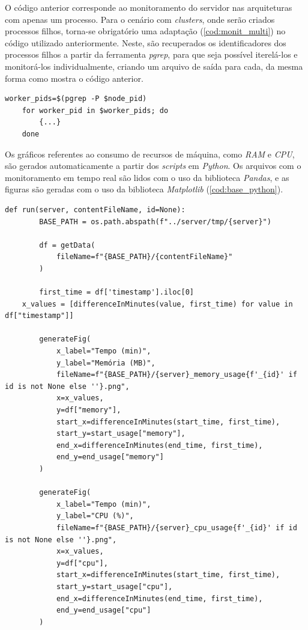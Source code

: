 \documentclass[12pt]{article}
\begin{document}
O código anterior corresponde ao monitoramento do servidor nas arquiteturas com apenas um processo. Para o cenário
com \textit{clusters}, onde serão criados processos filhos, torna-se obrigatório uma adaptação (\autoref{cod:monit_multi}) no código utilizado anteriormente. 
Neste, são recuperados os identificadores dos processos filhos 
a partir da ferramenta \textit{pgrep}, para que seja possível iterelá-los e monitorá-los individualmente, 
criando um arquivo de saída para cada, da mesma forma como mostra o código anterior.

\begin{lstlisting}[caption={\textit{Script} para monitrar processos \textit{multi thread}}, label=cod:monit_multi]
	worker_pids=$(pgrep -P $node_pid)
	for worker_pid in $worker_pids; do
		{...}
	done
\end{lstlisting}

Os gráficos referentes ao consumo de recursos de máquina, como \textit{RAM} e \textit{CPU}, são
gerados automaticamente a partir dos \textit{scripts} em \textit{Python}.
Os arquivos com o monitoramento em tempo real são lidos com o uso da biblioteca \textit{Pandas}, e
as figuras são geradas com o uso da biblioteca \textit{Matplotlib} (\autoref{cod:base_python}).

\begin{lstlisting}[caption={\textit{Script} base em \textit{Python} para geração de gráficos.}, label=cod:base_python]
	def run(server, contentFileName, id=None):
		BASE_PATH = os.path.abspath(f"../server/tmp/{server}")

		df = getData(
			fileName=f"{BASE_PATH}/{contentFileName}"
		)

		first_time = df['timestamp'].iloc[0]
  	x_values = [differenceInMinutes(value, first_time) for value in df["timestamp"]]

		generateFig(
			x_label="Tempo (min)",
			y_label="Memória (MB)",
			fileName=f"{BASE_PATH}/{server}_memory_usage{f'_{id}' if id is not None else ''}.png",
			x=x_values,
			y=df["memory"],
			start_x=differenceInMinutes(start_time, first_time),
			start_y=start_usage["memory"],
			end_x=differenceInMinutes(end_time, first_time),
			end_y=end_usage["memory"]
		)

		generateFig(
			x_label="Tempo (min)",
			y_label="CPU (%)",
			fileName=f"{BASE_PATH}/{server}_cpu_usage{f'_{id}' if id is not None else ''}.png",
			x=x_values,
			y=df["cpu"],
			start_x=differenceInMinutes(start_time, first_time),
			start_y=start_usage["cpu"],
			end_x=differenceInMinutes(end_time, first_time),
			end_y=end_usage["cpu"]
		)
\end{lstlisting}
\end{document}
